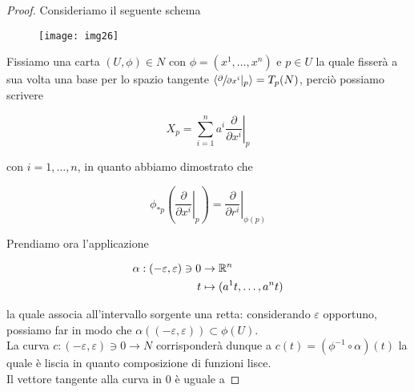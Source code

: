 \begin{proof}
	Consideriamo il seguente schema
	
	\begin{figure}[H]
		\centering
		\texttt{[image: img26]}
	\end{figure}

	Fissiamo una carta $ (U,\phi) \in N $ con $ \phi = (x^{1},\dots,x^{n}) $ e $ p \in U $ la quale fisserà a sua volta una base per lo spazio tangente $ \langle \sfrac{\partial}{\partial x^{i}} |_{p} \rangle = T_{p}(N) $, perciò possiamo scrivere
	
	\begin{equation}
		X_{p} = \sum_{i=1}^{n} a^{i} \left. \dfrac{\partial}{\partial x^{i}} \right|_{p}
	\end{equation}

	con $ i=1,\dots,n $, in quanto abbiamo dimostrato che
	
	\begin{equation}
		\phi_{*p} \left( \left. \dfrac{\partial}{\partial x^{i}} \right|_{p} \right) = \left. \dfrac{\partial}{\partial r^{i}} \right|_{\phi(p)}
	\end{equation}
	
	Prendiamo ora l'applicazione
	
	\begin{align}
		\begin{split}
			\alpha : (-\varepsilon,\varepsilon) \ni 0 &\to \mathbb{R}^{n}\\
			t &\mapsto (a^{1} t, \dots, a^{n} t)
		\end{split}
	\end{align}

	la quale associa all'intervallo sorgente una retta: considerando $ \varepsilon $ opportuno, possiamo far in modo che $ \alpha((-\varepsilon,\varepsilon)) \subset \phi(U) $.\\
	La curva $ c : (-\varepsilon,\varepsilon) \ni 0 \to N $ corrisponderà dunque a $ c(t) = (\phi^{-1} \circ \alpha)(t) $ la quale è liscia in quanto composizione di funzioni lisce.\\
	Il vettore tangente alla curva in 0 è uguale a
	

\end{proof}
